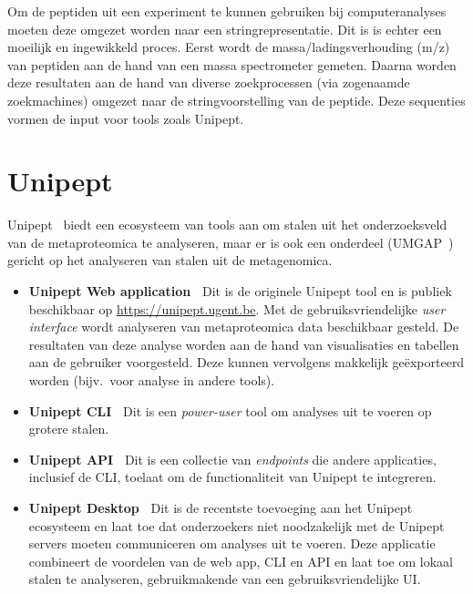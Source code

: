 Om de peptiden uit een experiment te kunnen gebruiken bij computeranalyses moeten deze omgezet worden naar een stringrepresentatie.
Dit is is echter een moeilijk en ingewikkeld proces.
Eerst wordt de massa/ladingsverhouding (m/z) van peptiden aan de hand van een massa spectrometer gemeten.
Daarna worden deze resultaten aan de hand van diverse zoekprocessen (via zogenaamde zoekmachines) omgezet naar de stringvoorstelling van de peptide.
Deze sequenties vormen de input voor tools zoals Unipept.


\section{Unipept}\label{sec:unipept-introductie}
Unipept~\cite{unipept_orig} biedt een ecosysteem van tools aan om stalen uit het onderzoeksveld van de metaproteomica te analyseren, maar er is ook een onderdeel (UMGAP~\cite{UMGAP_paper}) gericht op het analyseren van stalen uit de metagenomica.

\begin{itemize}
    \item \textbf{Unipept Web application~\cite{unipept_orig, unipept_web, unipept_tutorial, unipept_4}} Dit is de originele Unipept tool en is publiek beschikbaar op \url{https://unipept.ugent.be}.
    Met de gebruiksvriendelijke \textit{user interface} wordt analyseren van metaproteomica data beschikbaar gesteld.
    De resultaten van deze analyse worden aan de hand van visualisaties en tabellen aan de gebruiker voorgesteld.
    Deze kunnen vervolgens makkelijk geëxporteerd worden (bijv.~voor analyse in andere tools).
    \item \textbf{Unipept CLI~\cite{unipept_cli}} Dit is een \textit{power-user} tool om analyses uit te voeren op grotere stalen.
    \item \textbf{Unipept API~\cite{unipept_api, unipept_cli}} Dit is een collectie van \textit{endpoints} die andere applicaties, inclusief de CLI, toelaat om de functionaliteit van Unipept te integreren.
    \item \textbf{Unipept Desktop~\cite{unipept_desktop, unipept_desktop_2}} Dit is de recentste toevoeging aan het Unipept ecosysteem en laat toe dat onderzoekers niet noodzakelijk met de Unipept servers moeten communiceren om analyses uit te voeren.
    Deze applicatie combineert de voordelen van de web app, CLI en API en laat toe om lokaal stalen te analyseren, gebruikmakende van een gebruiksvriendelijke UI\@.

\end{itemize}

